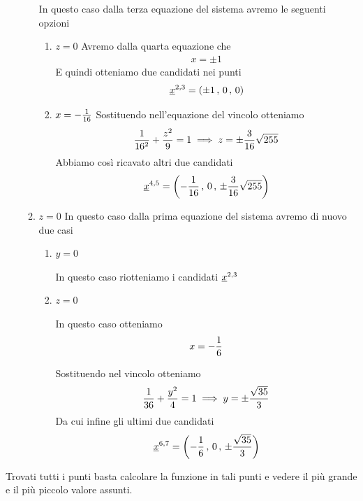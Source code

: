 \begin{enumerate}
\begin{enumerate}
		In questo caso dalla terza equazione del sistema avremo le seguenti opzioni
		\begin{enumerate}
			\item $z=0$
			Avremo dalla quarta equazione che
			\begin{align}
				x=\pm 1
			\end{align}
			E quindi otteniamo due candidati nei punti
			\begin{align}
				\underline{x}^{2,3}=(\pm 1 \, , \, 0 \, , \, 0)
			\end{align}
			\item $x= -\frac{1}{16}$
			Sostituendo nell'equazione del vincolo otteniamo
			\begin{align}
				\frac{1}{16^2} + \frac{z^2}{9}=1 \implies z = \pm \frac{3}{16}\sqrt{255}
			\end{align}
			Abbiamo così ricavato altri due candidati
			\begin{align}
				\underline{x}^{4,5}= \left( -\frac{1}{16} \, , \, 0 \, , \,  \pm \frac{3}{16}\sqrt{255}  \right)
			\end{align}
		\end{enumerate}
		\item $z=0$
		In questo caso dalla prima equazione del sistema avremo di nuovo due casi
		\begin{enumerate}
			\item $y=0$
			
			In questo caso riotteniamo i candidati $\underline{x}^{2,3}$
			
			\item $z=0$
			
			In questo caso otteniamo
			\begin{align}
				x=-\frac{1}{6}
			\end{align}
			
			Sostituendo nel vincolo otteniamo
			\begin{align}
				\frac{1}{36} + \frac{y^2}{4}=1 \implies y= \pm \frac{\sqrt{35}}{3}
			\end{align}
			Da cui infine gli ultimi due candidati
			\begin{align}
				\underline{x}^{6,7}= \left( -\frac{1}{6} \, , \, 0 \, , \,  \pm \frac{\sqrt{35}}{3} \right)
			\end{align}
		\end{enumerate} 
	\end{enumerate}
\end{enumerate}	


Trovati tutti i punti basta calcolare la funzione in tali punti e vedere il più grande e il più piccolo valore assunti.

